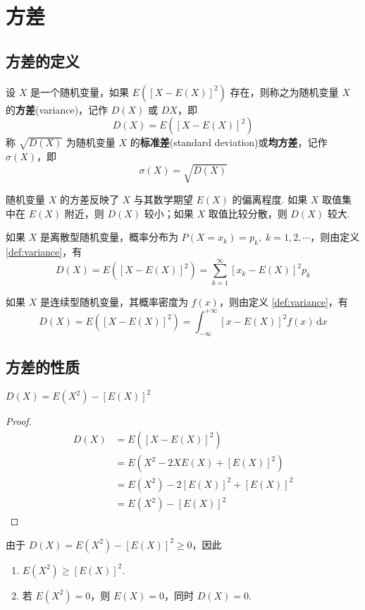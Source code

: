 \section{方差}

\subsection{方差的定义}

\begin{definition}
    \indent 设 $X$ 是一个随机变量，如果 $E([X-E(X)]^2)$ 存在，则称之为随机变量 $X$ 的\textbf{方差}(variance)，记作 $D(X)$ 或 $DX$，即
    $$
    D(X) = E([X-E(X)]^2)
    $$
    称 $\sqrt{D(X)}$ 为随机变量 $X$ 的\textbf{标准差}(standard deviation)或\textbf{均方差}，记作 $\sigma(X)$，即
    $$
    \sigma(X) = \sqrt{D(X)}
    $$
\end{definition}

随机变量 $X$ 的方差反映了 $X$ 与其数学期望 $E(X)$ 的偏离程度. 如果 $X$ 取值集中在 $E(X)$ 附近，则 $D(X)$ 较小；如果 $X$ 取值比较分散，则 $D(X)$ 较大.

如果 $X$ 是离散型随机变量，概率分布为 $P(X=x_k) = p_k, \; k=1,2,\cdots$，则由定义 \ref{def:variance}，有
$$
D(X) = E([X-E(X)]^2) = \sum_{k=1}^{\infty} [x_k - E(X)]^2 p_k
$$

如果 $X$ 是连续型随机变量，其概率密度为 $f(x)$，则由定义 \ref{def:variance}，有
$$
D(X) = E([X-E(X)]^2) = \int_{-\infty}^{+\infty} [x - E(X)]^2 f(x) \, \text{d}x
$$

\subsection{方差的性质}

\begin{property}
    \indent $D(X) = E(X^2) - [E(X)]^2$
\end{property}

\begin{proof}
    $$
    \begin{aligned}
        D(X) &= E([X-E(X)]^2) \\
        &= E(X^2 - 2XE(X) + [E(X)]^2) \\
        &= E(X^2) - 2[E(X)]^2 + [E(X)]^2 \\
        &= E(X^2) - [E(X)]^2
    \end{aligned}
    $$
\end{proof}

\begin{corollary}
    \indent 由于 $D(X) = E(X^2) - [E(X)]^2 \geqslant 0$，因此
    \begin{enumerate}
        \item $E(X^2) \geqslant [E(X)]^2$.
        \item 若 $E(X^2) = 0$，则 $E(X)=0$，同时 $D(X)=0$.
    \end{enumerate}
\end{corollary}

